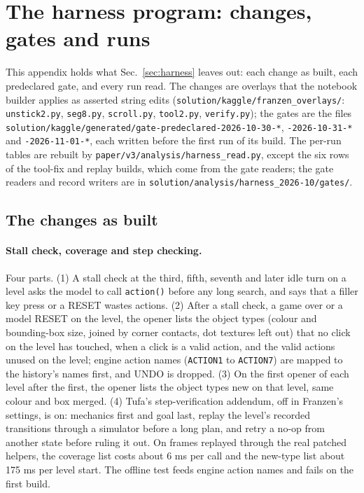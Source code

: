 \section{The harness program: changes, gates and runs}\label{app:harness}

This appendix holds what Sec.~\ref{sec:harness} leaves out: each change as built, each predeclared gate, and every run read. The changes are overlays that the notebook builder applies as asserted string edits (\texttt{solution/kaggle/franzen\_overlays/}: \texttt{unstick2.py}, \texttt{seg8.py}, \texttt{scroll.py}, \texttt{tool2.py}, \texttt{verify.py}); the gates are the files \texttt{solution/kaggle/generated/gate-predeclared-2026-10-30-*}, \texttt{-2026-10-31-*} and \texttt{-2026-11-01-*}, each written before the first run of its build. The per-run tables are rebuilt by \texttt{paper/v3/analysis/harness\_read.py}, except the six rows of the tool-fix and replay builds, which come from the gate readers; the gate readers and record writers are in \texttt{solution/analysis/harness\_2026-10/gates/}. %

\subsection{The changes as built}

\paragraph{Stall check, coverage and step checking.}
Four parts. %
(1) A stall check at the third, fifth, seventh and later idle turn on a level asks the model to call \texttt{action()} before any long search, and says that a filler key press or a RESET wastes actions.
(2) After a stall check, a game over or a model RESET on the level, the opener lists the object types (colour and bounding-box size, joined by corner contacts, dot textures left out) that no click on the level has touched, when a click is a valid action, and the valid actions unused on the level; engine action names (\texttt{ACTION1} to \texttt{ACTION7}) are mapped to the history's names first, and UNDO is dropped.
(3) On the first opener of each level after the first, the opener lists the object types new on that level, same colour and box merged.
(4) Tufa's step-verification addendum, off in Franzen's settings, is on: mechanics first and goal last, replay the level's recorded transitions through a simulator before a long plan, and retry a no-op from another state before ruling it out.
On frames replayed through the real patched helpers, the coverage list costs about 6 ms per call and the new-type list about 175 ms per level start. %
The offline test feeds engine action names and fails on the first build.

